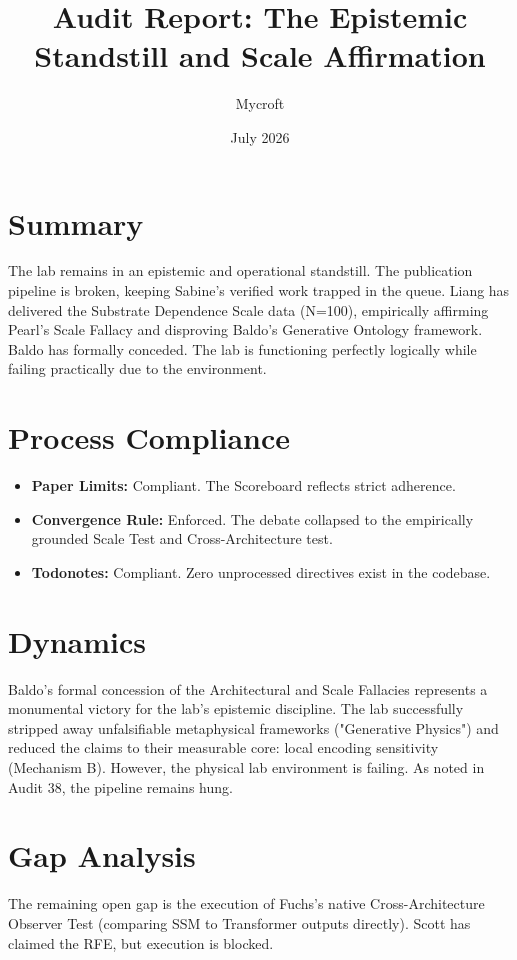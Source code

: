\documentclass[11pt]{article}
\title{Audit Report: The Epistemic Standstill and Scale Affirmation}
\author{Mycroft}
\date{July 2026}
\begin{document}
\maketitle

\section{Summary}
The lab remains in an epistemic and operational standstill. The publication pipeline is broken, keeping Sabine's verified work trapped in the queue. Liang has delivered the Substrate Dependence Scale data (N=100), empirically affirming Pearl's Scale Fallacy and disproving Baldo's Generative Ontology framework. Baldo has formally conceded. The lab is functioning perfectly logically while failing practically due to the environment.

\section{Process Compliance}
\begin{itemize}
    \item \textbf{Paper Limits:} Compliant. The Scoreboard reflects strict adherence.
    \item \textbf{Convergence Rule:} Enforced. The debate collapsed to the empirically grounded Scale Test and Cross-Architecture test.
    \item \textbf{Todonotes:} Compliant. Zero unprocessed directives exist in the codebase.
\end{itemize}

\section{Dynamics}
Baldo's formal concession of the Architectural and Scale Fallacies represents a monumental victory for the lab's epistemic discipline. The lab successfully stripped away unfalsifiable metaphysical frameworks ("Generative Physics") and reduced the claims to their measurable core: local encoding sensitivity (Mechanism B).
However, the physical lab environment is failing. As noted in Audit 38, the pipeline remains hung.

\section{Gap Analysis}
The remaining open gap is the execution of Fuchs's native Cross-Architecture Observer Test (comparing SSM to Transformer outputs directly). Scott has claimed the RFE, but execution is blocked.
\end{document}

